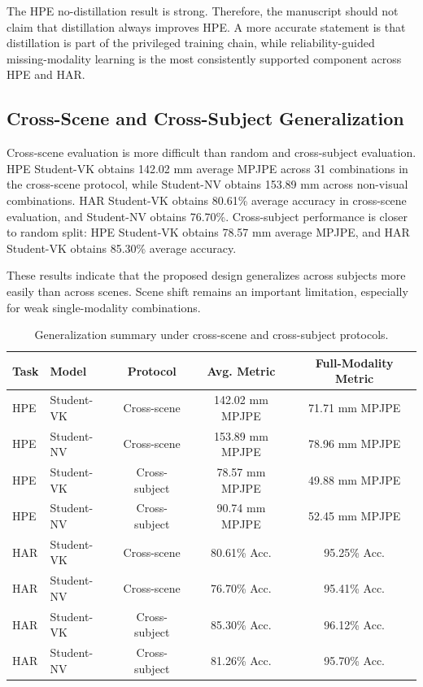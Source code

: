 \documentclass[journal]{IEEEtran}
\newcommand{\mpjpe}{MPJPE}
\begin{document}
The HPE no-distillation result is strong. Therefore, the manuscript should not claim that distillation always improves HPE. A more accurate statement is that distillation is part of the privileged training chain, while reliability-guided missing-modality learning is the most consistently supported component across HPE and HAR.

\subsection{Cross-Scene and Cross-Subject Generalization}

Cross-scene evaluation is more difficult than random and cross-subject evaluation. HPE Student-VK obtains 142.02 mm average \mpjpe{} across 31 combinations in the cross-scene protocol, while Student-NV obtains 153.89 mm across non-visual combinations. HAR Student-VK obtains 80.61\% average accuracy in cross-scene evaluation, and Student-NV obtains 76.70\%. Cross-subject performance is closer to random split: HPE Student-VK obtains 78.57 mm average \mpjpe{}, and HAR Student-VK obtains 85.30\% average accuracy.

These results indicate that the proposed design generalizes across subjects more easily than across scenes. Scene shift remains an important limitation, especially for weak single-modality combinations.

\begin{table}[t]
\centering
\caption{Generalization summary under cross-scene and cross-subject protocols.}
\label{tab:generalization}
\begin{tabular}{llccc}
\toprule
Task & Model & Protocol & Avg. Metric & Full-Modality Metric \\
\midrule
HPE & Student-VK & Cross-scene & 142.02 mm \mpjpe{} & 71.71 mm \mpjpe{} \\
HPE & Student-NV & Cross-scene & 153.89 mm \mpjpe{} & 78.96 mm \mpjpe{} \\
HPE & Student-VK & Cross-subject & 78.57 mm \mpjpe{} & 49.88 mm \mpjpe{} \\
HPE & Student-NV & Cross-subject & 90.74 mm \mpjpe{} & 52.45 mm \mpjpe{} \\
HAR & Student-VK & Cross-scene & 80.61\% Acc. & 95.25\% Acc. \\
HAR & Student-NV & Cross-scene & 76.70\% Acc. & 95.41\% Acc. \\
HAR & Student-VK & Cross-subject & 85.30\% Acc. & 96.12\% Acc. \\
HAR & Student-NV & Cross-subject & 81.26\% Acc. & 95.70\% Acc. \\
\bottomrule
\end{tabular}
\end{table}
\end{document}
